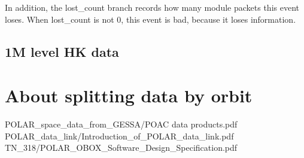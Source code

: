 \documentclass[a4paper, 12pt, onecolumn]{article}
\begin{document}
In addition, the lost\_count branch records how many module packets this event loses.
When lost\_count is not 0, this event is bad, because it loses information.

\subsection{1M level HK data}

\section{About splitting data by orbit}
\begin{thebibliography}{9}
 POLAR\_space\_data\_from\_GESSA/POAC data products.pdf
 POLAR\_data\_link/Introduction\_of\_POLAR\_data\_link.pdf
 TN\_318/POLAR\_OBOX\_Software\_Design\_Specification.pdf
\end{thebibliography}
\end{document}
